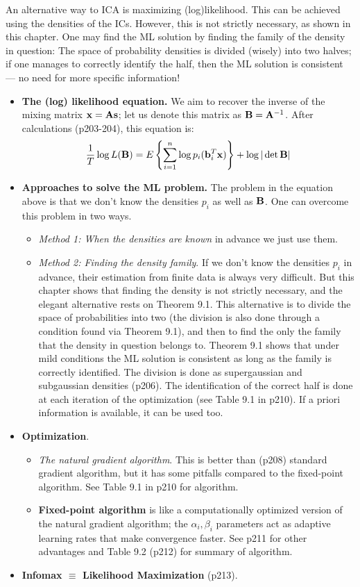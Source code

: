 \documentclass[a4paper, one	side]{book}
\begin{document}
An alternative way to ICA is maximizing (log)likelihood. This can be achieved using the densities of the ICs. However, this is not strictly necessary, as shown in this chapter. One may find the ML solution by finding the family of the density in question: The space of probability densities is divided (wisely) into two halves; if one manages to correctly identify the half, then the ML solution is consistent \---- no need for more specific information!


\begin{itemize}
\item \textbf{The (log) likelihood equation.} We aim to recover the inverse of the mixing matrix $\mathbf {x = As}$; let us denote this matrix as $\mathbf{B} = \mathbf A^{-1}$. After calculations (p203-204), this equation is: %
$$\frac{1}{T} \log L(\mathbf B) = E\left\{ \sum\limits_{i=1}^n \log p_i (\mathbf b_i^T \mathbf x) \right\} + \log |\det \mathbf B| $$  
\item \textbf{Approaches to solve the ML problem.} The problem in the equation above is that we don't know the densities $p_i$ as well as $\mathbf B$. One can overcome this problem in two ways.
	\begin{itemize}
	\item \textit{Method 1: When the densities are known} in advance we just use them.
	\item \textit{Method 2: Finding the density family}. If we don't know the densities $p_i$ in advance, their estimation from finite data is always very difficult. But this chapter shows that finding the density is not strictly necessary, and the elegant alternative rests on Theorem 9.1. This alternative is to divide the space of probabilities into two (the division is also done through a condition found via Theorem 9.1), and then to find the only the family that the density in question belongs to. Theorem 9.1 shows that under mild conditions the ML solution is consistent as long as the family is correctly identified. The division is done as supergaussian and subgaussian densities (p206). The identification of the correct half is done at each iteration of the optimization (see Table 9.1 in p210). If a priori information is available, it can be used too.
	\end{itemize}
\item \textbf{Optimization}.
	\begin{itemize}
	\item \textit{The natural gradient algorithm}. This is better than (p208) standard gradient algorithm, but it has some pitfalls compared to the fixed-point algorithm. See Table 9.1 in p210 for algorithm.
	\item \textbf{Fixed-point algorithm} is like a computationally optimized version of the natural gradient algorithm; the $\alpha_i, \beta_i$ parameters act as adaptive learning rates that make convergence faster. See p211 for other advantages and Table 9.2 (p212) for summary of algorithm.
	\end{itemize}
\item \textbf{Infomax $\equiv$ Likelihood Maximization } (p213).
\end{itemize}
\end{document}
